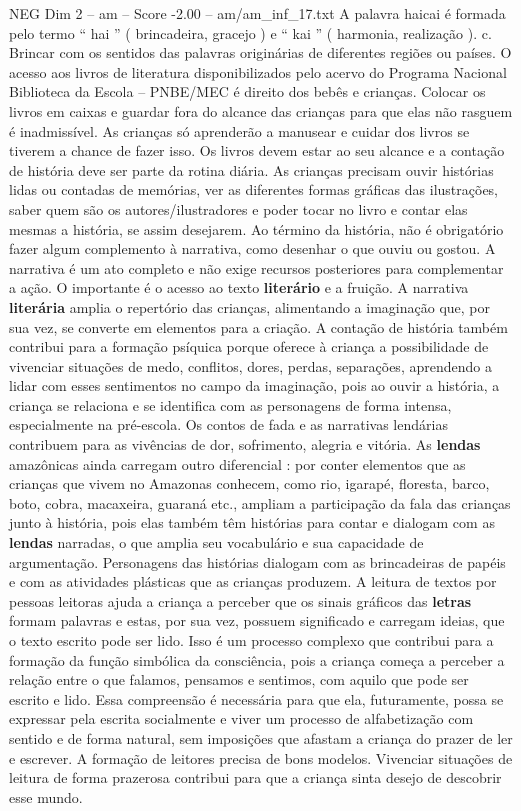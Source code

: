 \begin{textsample}{NEG Dim 2 – am – Score -2.00 – am/am\_inf\_17.txt}
A palavra haicai é formada pelo termo “ hai ” ( brincadeira, gracejo ) e “ kai ” ( harmonia, realização ). c.
Brincar com os sentidos das palavras originárias de diferentes regiões ou países.
O acesso aos livros de literatura disponibilizados pelo acervo do Programa Nacional Biblioteca da Escola – PNBE/MEC é direito dos bebês e crianças.
Colocar os livros em caixas e guardar fora do alcance das crianças para que elas não rasguem é inadmissível.
As crianças só aprenderão a manusear e cuidar dos livros se tiverem a chance de fazer isso.
Os livros devem estar ao seu alcance e a contação de história deve ser parte da rotina diária.
As crianças precisam ouvir histórias lidas ou contadas de memórias, ver as diferentes formas gráficas das ilustrações, saber quem são os autores/ilustradores e poder tocar no livro e contar elas mesmas a história, se assim desejarem.
Ao término da história, não é obrigatório fazer algum complemento à narrativa, como desenhar o que ouviu ou gostou.
A narrativa é um ato completo e não exige recursos posteriores para complementar a ação.
O importante é o acesso ao texto \textbf{literário} e a fruição.
A narrativa \textbf{literária} amplia o repertório das crianças, alimentando a imaginação que, por sua vez, se converte em elementos para a criação.
A contação de história também contribui para a formação psíquica porque oferece à criança a possibilidade de vivenciar situações de medo, conflitos, dores, perdas, separações, aprendendo a lidar com esses sentimentos no campo da imaginação, pois ao ouvir a história, a criança se relaciona e se identifica com as personagens de forma intensa, especialmente na pré-escola.
Os contos de fada e as narrativas lendárias contribuem para as vivências de dor, sofrimento, alegria e vitória.
As \textbf{lendas} amazônicas ainda carregam outro diferencial : por conter elementos que as crianças que vivem no Amazonas conhecem, como rio, igarapé, floresta, barco, boto, cobra, macaxeira, guaraná etc., ampliam a participação da fala das crianças junto à história, pois elas também têm histórias para contar e dialogam com as \textbf{lendas} narradas, o que amplia seu vocabulário e sua capacidade de argumentação.
Personagens das histórias dialogam com as brincadeiras de papéis e com as atividades plásticas que as crianças produzem.
A leitura de textos por pessoas leitoras ajuda a criança a perceber que os sinais gráficos das \textbf{letras} formam palavras e estas, por sua vez, possuem significado e carregam ideias, que o texto escrito pode ser lido.
Isso é um processo complexo que contribui para a formação da função simbólica da consciência, pois a criança começa a perceber a relação entre o que falamos, pensamos e sentimos, com aquilo que pode ser escrito e lido.
Essa compreensão é necessária para que ela, futuramente, possa se expressar pela escrita socialmente e viver um processo de alfabetização com sentido e de forma natural, sem imposições que afastam a criança do prazer de ler e escrever.
A formação de leitores precisa de bons modelos.
Vivenciar situações de leitura de forma prazerosa contribui para que a criança sinta desejo de descobrir esse mundo.

\end{textsample}
